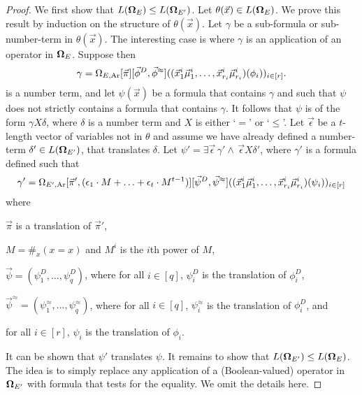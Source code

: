 \documentclass[../main/thesis.tex]{subfiles}
\begin{document}
\begin{proof}
  We first show that $L(\mathbf{\mathbf{\Omega}}_E) \leq L(\mathbf{\mathbf{\Omega}}_{E'})$. Let $\theta(\vec{x}) \in
  L(\mathbf{\mathbf{\Omega}}_E)$. We prove this result by induction on the structure of
  $\theta(\vec{x})$. Let $\gamma$ be a sub-formula or sub-number-term in
  $\theta(\vec{x})$. The interesting case is where $\gamma$ is an application of
  an operator in $\mathbf{\mathbf{\Omega}}_E$. Suppose then
  \begin{align*}
    \gamma = \Omega_{E, \text{\upshape Ar}}[\vec{\pi}][\vec{\phi}^D, \vec{\phi}^{\approx}] ((\vec{x}^i_1 \vec{\mu}^i_1, \ldots, \vec{x}^i_{r_i} \vec{\mu}^i_{r_i})(\phi_i))_{i \in [r]}.
  \end{align*}
  is a number term, and let $\psi(\vec{x})$ be a formula that contains $\gamma$
  and such that $\psi$ does not strictly contains a formula that contains
  $\gamma$. It follows that $\psi$ is of the form $\gamma X \delta$, where
  $\delta$ is a number term and $X$ is either `$=$' or `$\leq$'. Let
  $\vec{\epsilon}$ be a $t$-length vector of variables not in $\theta$ and
  assume we have already defined a number-term $\delta' \in L(\mathbf{\mathbf{\Omega}}_{E'})$,
  that translates $\delta$. Let $\psi' = \exists \vec{\epsilon} \, \gamma' \land
  \, \vec{\epsilon} X \delta'$, where $\gamma'$ is a formula defined such that
  \begin{align*}
    \gamma' = \Omega_{E', \text{\upshape Ar}}[\vec{\pi}', (\epsilon_1 \cdot M + \ldots + \epsilon_t \cdot M^{t-1})][\vec{\psi}^D, \vec{\psi}^{\approx}] ((\vec{x}^i_1 \vec{\mu}^i_1, \ldots, \vec{x}^i_{r_i} \vec{\mu}^i_{r_i})(\psi_i))_{i \in [r]}
  \end{align*}
  where
  \begin{myitemize}
  \item $\vec{\pi}$ is a translation of $\vec{\pi}'$,
  \item $M = \#_x (x = x)$ and $M^{i}$ is the $i$th power of $M$,
  \item $\vec{\psi} = (\psi^D_1, \ldots, \psi^D_{q})$, where for all $i \in
    [q]$, $\psi^D_i$ is the translation of $\phi^D_i$,
  \item $\vec{\psi}^{\approx} = (\psi^{\approx}_1, \ldots, \psi^{\approx}_q)$,
    where for all $i \in [q]$, $\psi^{\approx}_i$ is the translation of
    $\phi^D_i$, and
  \item for all $i \in [r]$, $\psi_i$ is the translation of $\phi_i$.
  \end{myitemize}
  It can be shown that $\psi'$ translates $\psi$. It remains to show that
  $L(\mathbf{\mathbf{\Omega}}_{E'}) \leq L(\mathbf{\mathbf{\Omega}}_{E})$. The idea is to simply replace any
  application of a (Boolean-valued) operator in $\mathbf{\mathbf{\Omega}}_{E'}$ with formula that
  tests for the equality. We omit the details here.
\end{proof}
\end{document}

